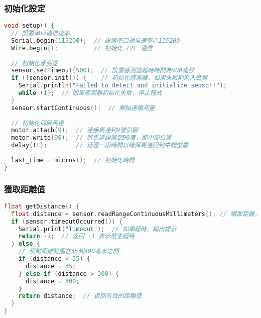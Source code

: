 \subsubsection{初始化設定}
\begin{lstlisting}[language=C]
void setup() {
  // 設置串口通信速率
  Serial.begin(115200);  // 設置串口通信速率為115200
  Wire.begin();          // 初始化 I2C 通信
  
  // 初始化感測器
  sensor.setTimeout(500);  // 設置感測器超時時間為500毫秒
  if (!sensor.init()) {    // 初始化感測器，如果失敗則進入循環
    Serial.println("Failed to detect and initialize sensor!");
    while (1);  // 如果感測器初始化失敗，停止程式
  }
  sensor.startContinuous();  // 開始連續測量
  
  // 初始化伺服馬達
  motor.attach(9);  // 連接馬達到9號引腳
  motor.write(90);  // 將馬達設置到90度，即中間位置
  delay(tt);        // 延遲一段時間以確保馬達回到中間位置
  
  last_time = micros();  // 初始化時間
}
\end{lstlisting}

\subsubsection{獲取距離值}
\begin{lstlisting}[language=C]
float getDistance() {
  float distance = sensor.readRangeContinuousMillimeters(); // 讀取距離，單位毫米
  if (sensor.timeoutOccurred()) {
    Serial.print("Timeout");  // 如果超時，輸出提示
    return -1;  // 返回 -1 表示發生超時
  } else {
    // 限制距離範圍在35到300毫米之間
    if (distance < 35) {
      distance = 35;
    } else if (distance > 300) {
      distance = 300;
    }
    return distance;  // 返回有效的距離值
  }
}
\end{lstlisting}

